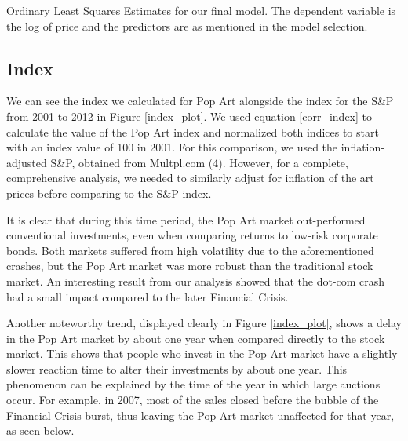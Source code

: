 \documentclass[]{asaproc}\usepackage[]{graphicx}\usepackage[]{color}
\begin{document}
\begin{table}[H]
\caption{\enspace Ordinary Least Squares Estimates for our final model. The dependent variable is the log of price and the predictors are as mentioned in the model selection.}\label{OLS}
\tiny 
\end{table}

\subsection{Index}

We can see the index we calculated for Pop Art alongside the index for the S\&P from 2001 to 2012 in Figure \ref{index_plot}. We used equation \ref{corr_index} to calculate the value of the Pop Art index and normalized both indices to start with an index value of 100 in 2001. For this comparison, we used the inflation-adjusted S\&P, obtained from Multpl.com (4). However, for a complete, comprehensive analysis, we needed to similarly adjust for inflation of the art prices before comparing to the S\&P index.  

It is clear that during this time period, the Pop Art market out-performed conventional investments, even when comparing returns to low-risk corporate bonds. Both markets suffered from high volatility due to the aforementioned crashes, but the Pop Art market was more robust than the traditional stock market. 
An interesting result from our analysis showed that the dot-com crash had a small impact compared to the later Financial Crisis.

Another noteworthy trend, displayed clearly in Figure \ref{index_plot}, shows a delay in the Pop Art market by about one year when compared directly to the stock market. This shows that people who invest in the Pop Art market have a slightly slower reaction time to alter their investments by about one year. This phenomenon can be explained by the time of the year in which large auctions occur. For example, in 2007, most of the sales closed before the bubble of the Financial Crisis burst, thus leaving the Pop Art market unaffected for that year, as seen below. 
\end{document}
